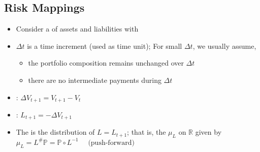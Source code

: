 \subsection*{Risk Mappings}
\begin{itemize}[leftmargin=*]
    \item Consider a  of assets and liabilities with 
    \item $\Delta t$ is a time increment (used as time unit); For small $\Delta t$, we usually assume,
    \begin{itemize}[leftmargin=*]
        \item the portfolio composition remains unchanged over $\Delta t$
        \item there are no intermediate payments during $\Delta t$
    \end{itemize}
    \item {}: $\Delta V_{t+1}=V_{t+1}-V_{t}$
    \item {}: $L_{t+1}=-\Delta V_{t+1}$
    \item The  is the distribution of $L=L_{t+1}$; that is, the  $\mu_{L}$ on $\mathbb{R}$ given by
    $\mu_{L}=L^{\#} \mathbb{P}=\mathbb{P} \circ L^{-1} \quad \text { (push-forward) }$
    

\end{itemize}

